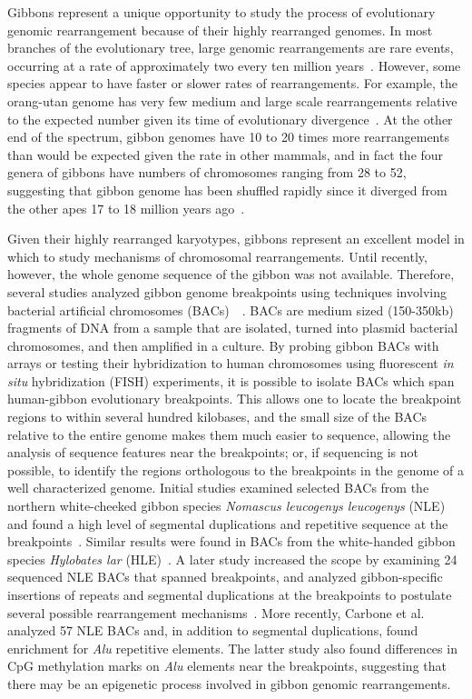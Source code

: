 Gibbons represent a unique opportunity to study the process of evolutionary genomic rearrangement because of their highly rearranged genomes. In most branches of the evolutionary tree, large genomic rearrangements are rare events, occurring at a rate of approximately two every ten million years~\cite{Wienberg:2004gt}. However, some species appear to have faster or slower rates of rearrangements. For example, the orang-utan genome has very few medium and large scale rearrangements relative to the expected number given its time of evolutionary divergence~\cite{Locke:2011gn}. At the other end of the spectrum, gibbon genomes have 10 to 20 times more rearrangements than would be expected given the rate in other mammals, and in fact the four genera of gibbons have numbers of chromosomes ranging from 28 to 52, suggesting that gibbon genome has been shuffled rapidly since it diverged from the other apes 17 to 18 million years ago~\cite{Misceo:2008kg}.

Given their highly rearranged karyotypes, gibbons represent an excellent model in which to study mechanisms of chromosomal rearrangements. Until recently, however, the whole genome sequence of the gibbon was not available. Therefore, several studies analyzed gibbon genome breakpoints using techniques involving bacterial artificial chromosomes (BACs)~~\cite{Girirajan:2009kw,Carbone:2006jk,Carbone:2009p1012}. BACs are medium sized (150-350kb) fragments of DNA from a sample that are isolated, turned into plasmid bacterial chromosomes, and then amplified in a culture. By probing gibbon BACs with arrays or testing their hybridization to human chromosomes using fluorescent \emph{in situ} hybridization (FISH) experiments, it is possible to isolate BACs which span human-gibbon evolutionary breakpoints. This allows one to locate the breakpoint regions to within several hundred kilobases, and the small size of the BACs relative to the entire genome makes them much easier to sequence, allowing the analysis of sequence features near the breakpoints; or, if sequencing is not possible, to identify the regions orthologous to the breakpoints in the genome of a well characterized genome. Initial studies examined selected BACs from the northern white-cheeked gibbon species \emph{Nomascus leucogenys leucogenys} (NLE) and found a high level of segmental duplications and repetitive sequence at the breakpoints~\cite{Carbone:2006jk,Roberto:2007dt}. Similar results were found in BACs from the white-handed gibbon species \emph{Hylobates lar} (HLE)~\cite{Misceo:2008kg}. A later study increased the scope by examining 24 sequenced NLE BACs that spanned breakpoints, and analyzed gibbon-specific insertions of repeats and segmental duplications at the breakpoints to postulate several possible rearrangement mechanisms~\cite{Girirajan:2009kw}. More recently, Carbone et al.~\cite{Carbone:2009p1012} analyzed 57 NLE BACs and, in addition to segmental duplications, found enrichment for \emph{Alu} repetitive elements. The latter study also found differences in CpG methylation marks on \emph{Alu} elements near the breakpoints, suggesting that there may be an epigenetic process involved in gibbon genomic rearrangements.

